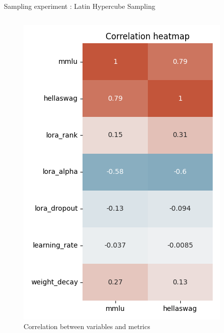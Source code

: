 \begin{frame}[allowframebreaks]{Sampling experiment : Latin Hypercube Sampling}
\begin{columns}
\begin{column}{0.45\textwidth}
    \end{column}
\end{columns}  
    \framebreak

    \begin{columns}
        \begin{column}{0.3\textwidth}
        \begin{figure}
            \centering
            \includegraphics[width = \textwidth]{imgs/experiments/lhs_correlation.png}     
            \caption{Correlation between variables and metrics}         
        \end{figure}
         

\end{column}
\end{columns}
\end{frame}
